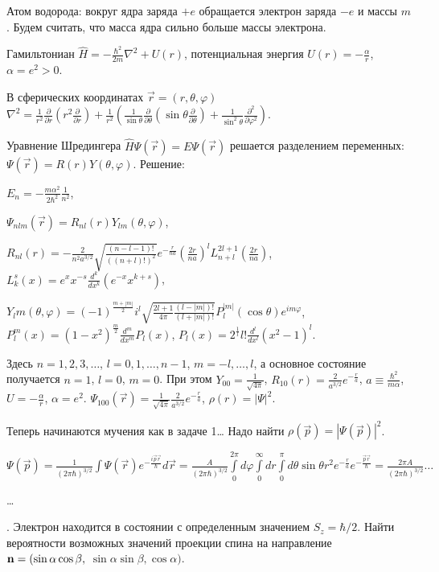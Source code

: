 \documentclass[a4paper,12pt]{article}
\begin{document}
Атом водорода: вокруг ядра заряда $+e$ обращается электрон заряда
$-e$ и массы $m$. Будем считать, что масса ядра сильно больше массы
электрона.

Гамильтониан $\hat H=-\frac{\hbar^2}{2m}\nabla^2+U(r)$,
потенциальная энергия $U(r)=-\frac\alpha r$, $\alpha=e^2>0$.

В сферических координатах $\vec r=(r,\theta,\varphi)$
$\nabla^2=\frac1{r^2}\frac\partial{\partial r}
    \left(r^2\frac\partial{\partial r}\right)
  +\frac1{r^2}\left(
    \frac1{\sin\theta}\frac\partial{\partial\theta}
      \left(\sin\theta\frac\partial{\partial\theta}\right)+
      \frac1{\sin^2\theta}\frac{\partial^2}{\partial\varphi^2}\right)$.

Уравнение Шредингера $\hat H\Psi(\vec r)=E\Psi(\vec r)$ решается
разделением переменных: $\Psi(\vec r)=R(r)Y(\theta,\varphi)$. Решение:

$E_n=-\frac{m\alpha^2}{2\hbar^2}\frac1{n^2}$,\par
$\Psi_{nlm}(\vec r)=R_{nl}(r)Y_{lm}(\theta,\varphi)$,\par
$R_{nl}(r)=-\frac2{n^2a^{3/2}}\sqrt{\frac{(n-l-1)!}{((n+l)!)^2}}
  e^{-\frac r{na}}\left(\frac{2r}{na}\right)^lL_{n+l}^{2l+1}
  \left(\frac{2r}{na}\right)$,
$L_k^s(x)=e^xx^{-s}\frac{d^k}{dx^k}(e^{-x}x^{k+s})$,\par
$Y_lm(\theta,\varphi)=(-1)^{\frac{m+|m|}2}i^l
  \sqrt{\frac{2l+1}{4\pi}\frac{(l-|m|)!}{(l+|m|)!}}
  P_l^{|m|}(\cos\theta)e^{im\varphi}$,
$P_l^m(x)=(1-x^2)^{\frac m2}\frac{d^m}{dx^m}P_l(x)$,
$P_l(x)=2^{\frac1l}l!\frac{d^l}{dx^l}(x^2-1)^l$.

Здесь $n=1,2,3,\ldots$, $l=0,1,\ldots,n-1$, $m=-l,\ldots,l$, а основное
состояние получается $n=1$, $l=0$, $m=0$. При этом
$Y_{00}=\frac1{\sqrt{4\pi}}$, $R_{10}(r)=\frac2{a^{3/2}}e^{-\frac ra}$,
$a\equiv\frac{\hbar^2}{m\alpha}$, $U=-\frac\alpha r$, $\alpha=e^2$.
$\Psi_{100}(\vec r)=\frac1{\sqrt{4\pi}}\frac2{a^{3/2}}e^{-\frac ra}$,
$\rho(r)=|\Psi|^2$.

Теперь начинаются мучения как в задаче 1\ldots{} Надо найти
$\rho(\vec p)=|\Psi(\vec p)|^2$.

$\Psi(\vec p)=\frac1{(2\pi\hbar)^{3/2}}\int\Psi(\vec r)
    e^{-\frac{i\vec p\vec r}\hbar}d\vec r=
  \frac A{(2\pi\hbar)^{3/2}}
    \int\limits_0^{2\pi}d\varphi
    \int\limits_0^\infty dr
    \int\limits_0^\pi d\theta
    \sin\theta r^2e^{-\frac ra}e^{-\frac{\vec p\vec r}\hbar}=
  \frac{2\pi A}{(2\pi\hbar)^{3/2}}\ldots$

\ldots


. Электрон находится в состоянии с определенным
значением $S_z = \hbar / 2$. Найти вероятности возможных значений
проекции спина на направление ${\bf n} = ( \sin \alpha \cos \beta
,$ $ \sin \alpha \sin \beta ,\cos \alpha )$.
\end{document}

